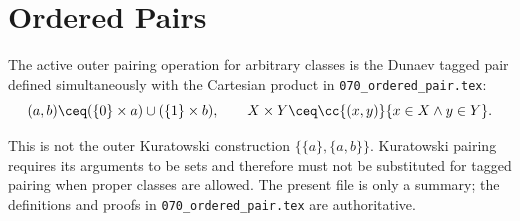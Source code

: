 \def\topic{Ordered Pairs: Active Convention}

\section{Ordered Pairs}

The active outer pairing operation for arbitrary classes is the Dunaev tagged
pair defined simultaneously with the Cartesian product in
\texttt{070\_ordered\_pair.tex}:
\[
(a,b)\ceq(\{0\}\times a)\cup(\{1\}\times b),
\qquad
X\times Y\ceq\cc{(x,y)}{x\in X\land y\in Y}.
\]

This is not the outer Kuratowski construction
$\{\{a\},\{a,b\}\}$. Kuratowski pairing requires its arguments to be sets and
therefore must not be substituted for tagged pairing when proper classes are
allowed. The present file is only a summary; the definitions and proofs in
\texttt{070\_ordered\_pair.tex} are authoritative.


